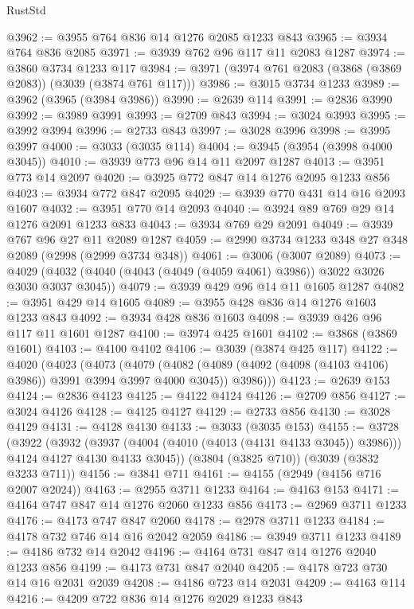 \begin{lexlean}{RustStd}
\begin{coremodule}
@3962 := @3955 @764 @836 @14 @1276 @2085 @1233 @843
@3965 := @3934 @764 @836 @2085
@3971 := @3939 @762 @96 @117 @11 @2083 @1287
@3974 := @3860 @3734 @1233 @117
@3984 := @3971 (@3974 @761 @2083 (@3868 (@3869 @2083)) (@3039 (@3874 @761 @117)))
@3986 := @3015 @3734 @1233
@3989 := @3962 (@3965 (@3984 @3986))
@3990 := @2639 @114
@3991 := @2836 @3990
@3992 := @3989 @3991
@3993 := @2709 @843
@3994 := @3024 @3993
@3995 := @3992 @3994
@3996 := @2733 @843
@3997 := @3028 @3996
@3998 := @3995 @3997
@4000 := @3033 (@3035 @114)
@4004 := @3945 (@3954 (@3998 @4000 @3045))
@4010 := @3939 @773 @96 @14 @11 @2097 @1287
@4013 := @3951 @773 @14 @2097
@4020 := @3925 @772 @847 @14 @1276 @2095 @1233 @856
@4023 := @3934 @772 @847 @2095
@4029 := @3939 @770 @431 @14 @16 @2093 @1607
@4032 := @3951 @770 @14 @2093
@4040 := @3924 @89 @769 @29 @14 @1276 @2091 @1233 @833
@4043 := @3934 @769 @29 @2091
@4049 := @3939 @767 @96 @27 @11 @2089 @1287
@4059 := @2990 @3734 @1233 @348 @27 @348 @2089 (@2998 (@2999 @3734 @348))
@4061 := @3006 (@3007 @2089)
@4073 := @4029 (@4032 (@4040 (@4043 (@4049 (@4059 @4061) @3986)) @3022 @3026 @3030 @3037 @3045))
@4079 := @3939 @429 @96 @14 @11 @1605 @1287
@4082 := @3951 @429 @14 @1605
@4089 := @3955 @428 @836 @14 @1276 @1603 @1233 @843
@4092 := @3934 @428 @836 @1603
@4098 := @3939 @426 @96 @117 @11 @1601 @1287
@4100 := @3974 @425 @1601
@4102 := @3868 (@3869 @1601)
@4103 := @4100 @4102
@4106 := @3039 (@3874 @425 @117)
@4122 := @4020
    (@4023
      (@4073
        (@4079
          (@4082 (@4089 (@4092 (@4098 (@4103 @4106) @3986)) @3991 @3994 @3997 @4000 @3045))
          @3986)))
@4123 := @2639 @153
@4124 := @2836 @4123
@4125 := @4122 @4124
@4126 := @2709 @856
@4127 := @3024 @4126
@4128 := @4125 @4127
@4129 := @2733 @856
@4130 := @3028 @4129
@4131 := @4128 @4130
@4133 := @3033 (@3035 @153)
@4155 := @3728
    (@3922
      (@3932
        (@3937 (@4004 (@4010 (@4013 (@4131 @4133 @3045)) @3986)))
        @4124
        @4127
        @4130
        @4133
        @3045))
    (@3804 (@3825 @710))
    (@3039 (@3832 @3233 @711))
@4156 := @3841 @711
@4161 := @4155 (@2949 (@4156 @716 @2007 @2024))
@4163 := @2955 @3711 @1233
@4164 := @4163 @153
@4171 := @4164 @747 @847 @14 @1276 @2060 @1233 @856
@4173 := @2969 @3711 @1233
@4176 := @4173 @747 @847 @2060
@4178 := @2978 @3711 @1233
@4184 := @4178 @732 @746 @14 @16 @2042 @2059
@4186 := @3949 @3711 @1233
@4189 := @4186 @732 @14 @2042
@4196 := @4164 @731 @847 @14 @1276 @2040 @1233 @856
@4199 := @4173 @731 @847 @2040
@4205 := @4178 @723 @730 @14 @16 @2031 @2039
@4208 := @4186 @723 @14 @2031
@4209 := @4163 @114
@4216 := @4209 @722 @836 @14 @1276 @2029 @1233 @843

\end{coremodule}
\end{lexlean}
